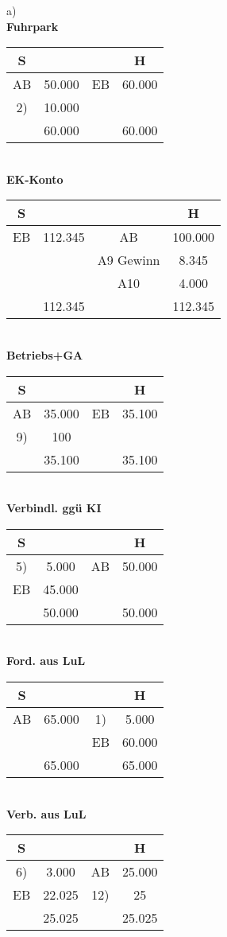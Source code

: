 \documentclass[paper=a4, fontsize=11pt]{scrartcl}
\numberwithin{equation}{section}
\numberwithin{figure}{section}
\numberwithin{table}{section}
\begin{document}
a) \\
\textbf{Fuhrpark}
\begin{tabular}{cc|cc}
S & & & H \\\hline
AB & 50.000 & EB & 60.000 \\
 2) & 10.000 & & \\\hline
  & 60.000 & & 60.000 \\\hline
\end{tabular} \\
\textbf{EK-Konto}
\begin{tabular}{cc|cc}
S & & & H \\\hline
EB & 112.345 & AB & 100.000 \\
  & & A9 Gewinn & 8.345 \\
  & & A10 & 4.000  \\\hline
  & 112.345 & & 112.345  \\\hline
\end{tabular} \\
\textbf{Betriebs+GA}
\begin{tabular}{cc|cc}
S & & & H \\\hline
AB & 35.000 & EB & 35.100 \\
9) & 100 & & \\\hline
  & 35.100 & & 35.100 \\\hline
\end{tabular} \\
\textbf{Verbindl. ggü KI}
\begin{tabular}{cc|cc}
S & & & H \\\hline
5) & 5.000 & AB & 50.000 \\
EB & 45.000 & & \\\hline
  & 50.000 & & 50.000 \\\hline
\end{tabular} \\
\textbf{Ford. aus LuL}
\begin{tabular}{cc|cc}
S & & & H \\\hline
AB & 65.000 & 1) & 5.000 \\
  & & EB & 60.000 \\\hline
  & 65.000 & & 65.000 \\\hline
\end{tabular} \\
\textbf{Verb. aus LuL}
\begin{tabular}{cc|cc}
S & & & H \\\hline
6) & 3.000 & AB & 25.000 \\
EB & 22.025 & 12) & 25 \\\hline
  & 25.025 & & 25.025 \\\hline
\end{tabular} \\
\end{document}
